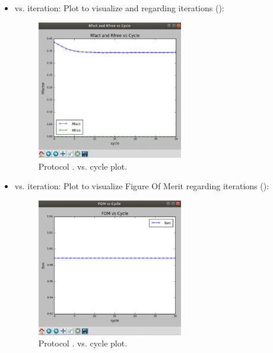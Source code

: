 \begin{itemize}
\begin{itemize}
     \item {} vs. iteration:
     Plot to visualize  and  regarding iterations ():
        \begin{figure}[H]
         \centering 
         \captionsetup{width=.7\linewidth} 
         \includegraphics[width=0.60\textwidth]{Images_appendix/Fig133.pdf}
         \caption{Protocol .  vs. cycle plot.}
         \label{fig:app_protocol_refmac_8}
        \end{figure}
     \item {} vs. iteration:
     Plot to visualize Figure Of Merit regarding iterations ():
        \begin{figure}[H]
         \centering 
         \captionsetup{width=.7\linewidth} 
         \includegraphics[width=0.60\textwidth]{Images_appendix/Fig134.pdf}
         \caption{Protocol .  vs. cycle plot.}
         \label{fig:app_protocol_refmac_9}
        \end{figure}

\end{itemize}
\end{itemize}
